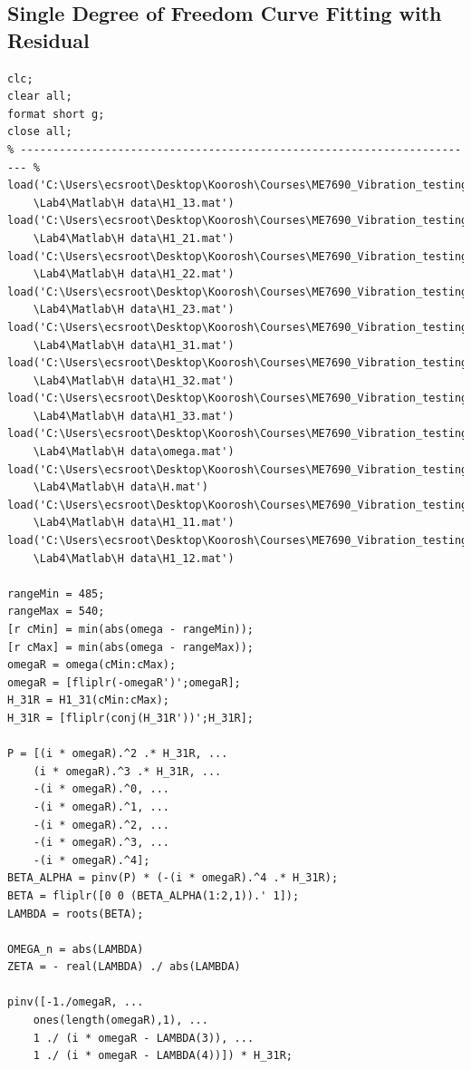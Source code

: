 \documentclass[paper=a4, fontsize=12pt]{scrartcl} %
\begin{document}
\subsection*{Single Degree of Freedom Curve Fitting with Residual}
\begin{lstlisting}
clc;
clear all;
format short g;
close all;
% ----------------------------------------------------------------------- %
load('C:\Users\ecsroot\Desktop\Koorosh\Courses\ME7690_Vibration_testing
	\Lab4\Matlab\H data\H1_13.mat')
load('C:\Users\ecsroot\Desktop\Koorosh\Courses\ME7690_Vibration_testing
	\Lab4\Matlab\H data\H1_21.mat')
load('C:\Users\ecsroot\Desktop\Koorosh\Courses\ME7690_Vibration_testing
	\Lab4\Matlab\H data\H1_22.mat')
load('C:\Users\ecsroot\Desktop\Koorosh\Courses\ME7690_Vibration_testing
	\Lab4\Matlab\H data\H1_23.mat')
load('C:\Users\ecsroot\Desktop\Koorosh\Courses\ME7690_Vibration_testing
	\Lab4\Matlab\H data\H1_31.mat')
load('C:\Users\ecsroot\Desktop\Koorosh\Courses\ME7690_Vibration_testing
	\Lab4\Matlab\H data\H1_32.mat')
load('C:\Users\ecsroot\Desktop\Koorosh\Courses\ME7690_Vibration_testing
	\Lab4\Matlab\H data\H1_33.mat')
load('C:\Users\ecsroot\Desktop\Koorosh\Courses\ME7690_Vibration_testing
	\Lab4\Matlab\H data\omega.mat')
load('C:\Users\ecsroot\Desktop\Koorosh\Courses\ME7690_Vibration_testing
	\Lab4\Matlab\H data\H.mat')
load('C:\Users\ecsroot\Desktop\Koorosh\Courses\ME7690_Vibration_testing
	\Lab4\Matlab\H data\H1_11.mat')
load('C:\Users\ecsroot\Desktop\Koorosh\Courses\ME7690_Vibration_testing
	\Lab4\Matlab\H data\H1_12.mat')

rangeMin = 485;
rangeMax = 540;
[r cMin] = min(abs(omega - rangeMin));
[r cMax] = min(abs(omega - rangeMax));
omegaR = omega(cMin:cMax);
omegaR = [fliplr(-omegaR')';omegaR];
H_31R = H1_31(cMin:cMax);
H_31R = [fliplr(conj(H_31R'))';H_31R];

P = [(i * omegaR).^2 .* H_31R, ...
    (i * omegaR).^3 .* H_31R, ...
    -(i * omegaR).^0, ...
    -(i * omegaR).^1, ...
    -(i * omegaR).^2, ...
    -(i * omegaR).^3, ...
    -(i * omegaR).^4];
BETA_ALPHA = pinv(P) * (-(i * omegaR).^4 .* H_31R);
BETA = fliplr([0 0 (BETA_ALPHA(1:2,1)).' 1]);
LAMBDA = roots(BETA);

OMEGA_n = abs(LAMBDA)
ZETA = - real(LAMBDA) ./ abs(LAMBDA)

pinv([-1./omegaR, ...
    ones(length(omegaR),1), ...
    1 ./ (i * omegaR - LAMBDA(3)), ...
    1 ./ (i * omegaR - LAMBDA(4))]) * H_31R;
\end{lstlisting}
\end{document}
